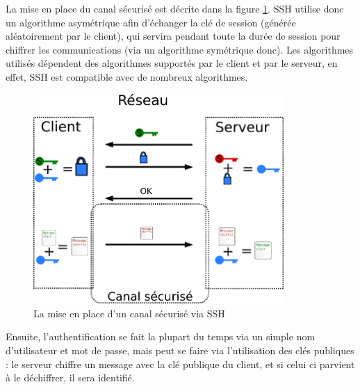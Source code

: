 La mise en place du canal sécurisé est décrite dans la figure
\ref{fig:CanalSecuriseSSH}. SSH utilise donc un algorithme asymétrique
afin d'échanger la clé de session (générée aléatoirement par le
client), qui servira pendant toute la
durée de session pour chiffrer les communications (via un
algorithme symétrique donc). Les algorithmes utilisés dépendent
des algorithmes supportés par le client et par le serveur, en
effet, SSH est compatible avec de nombreux algorithmes.

 
\begin{figure}[h]
  \centering
    \label{fig:CanalSecuriseSSH}\includegraphics[width=0.85\textwidth]{images/SSH.png}
    \caption{La mise en place d'un canal sécurisé via SSH}
\end{figure}

Ensuite, l'authentification se fait la plupart du temps via un
simple nom d'utilisateur et mot de passe, mais peut se faire via
l'utilisation des clés publiques : le serveur chiffre un message 
avec la clé
publique du client, et si celui ci parvient à le déchiffrer, il
sera identifié.
